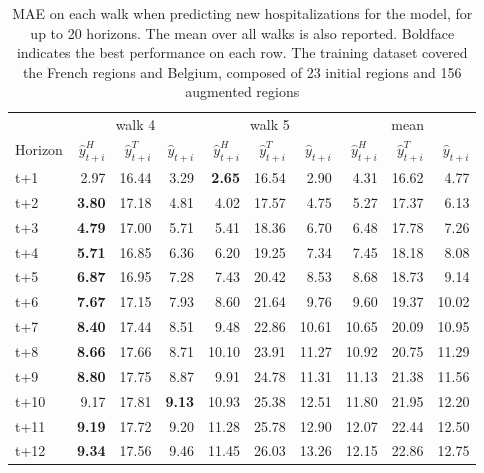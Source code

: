 \begin{table}[H]
\centering
\caption{MAE on each walk when predicting new hospitalizations for the model, for up to 20 horizons. The mean over all walks is also reported. Boldface indicates the best performance on each row. The training dataset covered the French regions and Belgium, composed of 23 initial regions and 156 augmented regions }
\label{tab:MAE_walk_assemble}
\begin{tabular}{lrrrrrrrrr}
\toprule
 & \multicolumn{3}{c}{walk 4} & \multicolumn{3}{c}{walk 5} & \multicolumn{3}{c}{mean} 
\\

\cmidrule(lr){2-4} \cmidrule(lr){5-7} \cmidrule(lr){8-10} 
Horizon & $\hat{y}_{t+i}^H$ & $\hat{y}_{t+i}^T$ & $\hat{y}_{t+i}$ & $\hat{y}_{t+i}^H$ & $\hat{y}_{t+i}^T$ & $\hat{y}_{t+i}$ & $\hat{y}_{t+i}^H$ & $\hat{y}_{t+i}^T$ & $\hat{y}_{t+i}$ \\
\midrule
t+1  & 2.97  & 16.44  & 3.29  & \textbf{2.65}  & 16.54  & 2.90  & 4.31  & 16.62  & 4.77  \\
t+2  & \textbf{3.80}  & 17.18  & 4.81  & 4.02  & 17.57  & 4.75  & 5.27  & 17.37  & 6.13  \\
t+3  & \textbf{4.79}  & 17.00  & 5.71  & 5.41  & 18.36  & 6.70  & 6.48  & 17.78  & 7.26  \\
t+4  & \textbf{5.71}  & 16.85  & 6.36  & 6.20  & 19.25  & 7.34  & 7.45  & 18.18  & 8.08  \\
t+5  & \textbf{6.87}  & 16.95  & 7.28  & 7.43  & 20.42  & 8.53  & 8.68  & 18.73  & 9.14  \\
t+6  & \textbf{7.67}  & 17.15  & 7.93  & 8.60  & 21.64  & 9.76  & 9.60  & 19.37  & 10.02  \\
t+7  & \textbf{8.40}  & 17.44  & 8.51  & 9.48  & 22.86  & 10.61  & 10.65  & 20.09  & 10.95  \\
t+8  & \textbf{8.66}  & 17.66  & 8.71  & 10.10  & 23.91  & 11.27  & 10.92  & 20.75  & 11.29  \\
t+9  & \textbf{8.80}  & 17.75  & 8.87  & 9.91  & 24.78  & 11.31  & 11.13  & 21.38  & 11.56  \\
t+10  & 9.17  & 17.81  & \textbf{9.13}  & 10.93  & 25.38  & 12.51  & 11.80  & 21.95  & 12.20  \\
t+11  & \textbf{9.19}  & 17.72  & 9.20  & 11.28  & 25.78  & 12.90  & 12.07  & 22.44  & 12.50  \\
t+12  & \textbf{9.34}  & 17.56  & 9.46  & 11.45  & 26.03  & 13.26  & 12.15  & 22.86  & 12.75  \\

\end{tabular}
\end{table}
